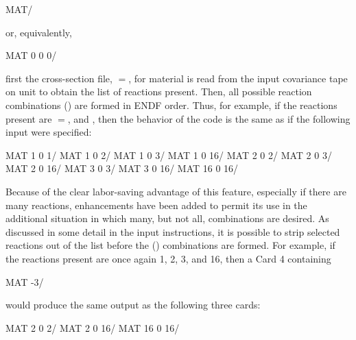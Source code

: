 \small
\begin{ccode}

     MAT/

\end{ccode}
\normalsize

\noindent
or, equivalently,

\small
\begin{ccode}

     MAT 0 0 0/

\end{ccode}
\normalsize

\noindent
first the cross-section file, $ = $, for material
 is read from the input covariance tape on unit
 to obtain the list of reactions present.  Then, all
possible reaction combinations () are formed in ENDF
order.  Thus, for example, if the reactions present are $ =
$, and , then the behavior of the code is the
same as if the following input were specified:

\small
\begin{ccode}

     MAT 1 0 1/
     MAT 1 0 2/
     MAT 1 0 3/
     MAT 1 0 16/
     MAT 2 0 2/
     MAT 2 0 3/
     MAT 2 0 16/
     MAT 3 0 3/
     MAT 3 0 16/
     MAT 16 0 16/

\end{ccode}
\normalsize

\noindent
Because of the clear labor-saving advantage of this feature, especially if
there are many reactions, enhancements have been added to permit its use
in the additional situation in which many, but not all, combinations are
desired.  As discussed in some detail in the input instructions, it is
possible to strip selected reactions out of the list before the
() combinations are formed.  For example, if the reactions
present are once again 1, 2, 3, and 16, then a Card 4 containing

\small
\begin{ccode}

     MAT -3/

\end{ccode}
\normalsize

\noindent
would produce the same output as the following three cards:

\small
\begin{ccode}

     MAT 2 0 2/
     MAT 2 0 16/
     MAT 16 0 16/

\end{ccode}
\normalsize

